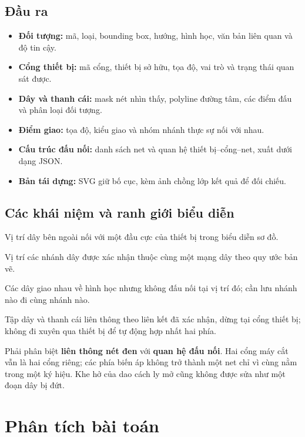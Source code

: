 \documentclass[11pt,a4paper]{article}
\begin{document}
\subsection{Đầu ra}
\begin{itemize}
  \item \textbf{Đối tượng:} mã, loại, bounding box, hướng, hình học, văn bản liên quan và độ tin cậy.
  \item \textbf{Cổng thiết bị:} mã cổng, thiết bị sở hữu, tọa độ, vai trò và trạng thái quan sát được.
  \item \textbf{Dây và thanh cái:} mask nét nhìn thấy, polyline đường tâm, các điểm đấu và phân loại đối tượng.
  \item \textbf{Điểm giao:} tọa độ, kiểu giao và nhóm nhánh thực sự nối với nhau.
  \item \textbf{Cấu trúc đấu nối:} danh sách net và quan hệ thiết bị--cổng--net, xuất dưới dạng JSON.
  \item \textbf{Bản tái dựng:} SVG giữ bố cục, kèm ảnh chồng lớp kết quả để đối chiếu.
\end{itemize}

\subsection{Các khái niệm và ranh giới biểu diễn}
\begin{description}[style=nextline,leftmargin=0pt]
  \item[Cổng (port)] Vị trí dây bên ngoài nối với một đầu cực của thiết bị trong biểu diễn sơ đồ.
  \item[Điểm nối (junction)] Vị trí các nhánh dây được xác nhận thuộc cùng một mạng dây theo quy ước bản vẽ.
  \item[Giao không nối (crossing)] Các dây giao nhau về hình học nhưng không đấu nối tại vị trí đó; cần lưu nhánh nào đi cùng nhánh nào.
  \item[Mạng dây (net)] Tập dây và thanh cái liên thông theo liên kết đã xác nhận, dừng tại cổng thiết bị; không đi xuyên qua thiết bị để tự động hợp nhất hai phía.
\end{description}
Phải phân biệt \textbf{liên thông nét đen} với \textbf{quan hệ đấu nối}. Hai cổng máy cắt vẫn là hai cổng riêng; các phía biến áp không trở thành một net chỉ vì cùng nằm trong một ký hiệu. Khe hở của dao cách ly mở cũng không được sửa như một đoạn dây bị đứt.

\section{Phân tích bài toán}
\end{document}
